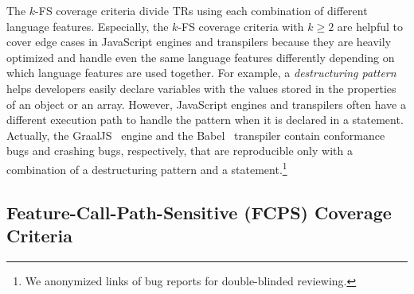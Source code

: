 \documentclass[acmsmall,review,screen]{acmart}
\newcommand{\jscode}[1]{\text{\lstinline[style=JS]!#1!}}
\begin{document}

The $k$-FS coverage criteria divide TRs using each combination of different
language features.
%
Especially, the $k$-FS coverage criteria with $k \geq 2$ are helpful to cover
edge cases in JavaScript engines and transpilers because they are heavily
optimized and handle even the same language features differently depending on which
language features are used together.
%
For example, a \textit{destructuring pattern}~\cite{jsdp} helps developers easily declare
variables with the values stored in the properties of an object or an array.
%
However, JavaScript engines and transpilers often have a different execution
path to handle the pattern when it is declared in a \jscode{for-in/of} statement.
%
Actually, the GraalJS~\cite{graaljs} engine and the Babel~\cite{babel}
transpiler contain conformance bugs and crashing bugs, respectively, that are
reproducible only with a combination of a destructuring pattern and a \jscode{for-in/of}
statement.\footnote{
  We anonymized links of bug reports for double-blinded reviewing.
}


\subsection{Feature-Call-Path-Sensitive (FCPS) Coverage
Criteria}\label{sec:fcps-cov}
\end{document}
